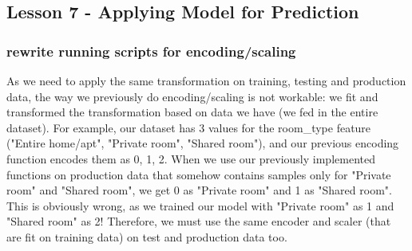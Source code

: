 \documentclass[11pt]{article}
\begin{document}
    \subsection{Lesson 7 - Applying Model for
Prediction}\label{lesson-7---applying-model-for-prediction}

    \subsubsection{rewrite running scripts for
encoding/scaling}\label{rewrite-running-scripts-for-encodingscaling}

As we need to apply the same transformation on training, testing and
production data, the way we previously do encoding/scaling is not
workable: we fit and transformed the transformation based on data we
have (we fed in the entire dataset). For example, our dataset has 3
values for the room\_type feature ("Entire home/apt", "Private room",
"Shared room"), and our previous encoding function encodes them as 0, 1,
2. When we use our previously implemented functions on production data
that somehow contains samples only for "Private room" and "Shared room",
we get 0 as "Private room" and 1 as "Shared room". This is obviously
wrong, as we trained our model with "Private room" as 1 and "Shared
room" as 2! Therefore, we must use the same encoder and scaler (that are
fit on training data) on test and production data too.
\end{document}
